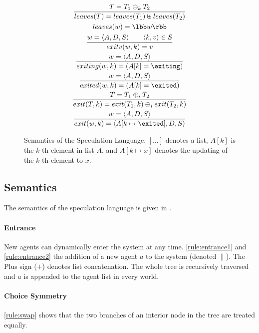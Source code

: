 \begin{figure}[ht!]
\flushright{}
\begin{gather*}
  \frac
  {T = T_1\oplus_k T_2}
  {leaves(T) = leaves(T_1)\uplus leaves(T_2)} \\
  leaves(w) = \lbb w\rbb \\
  \frac
  {w=\langle A,D,S\rangle \qquad \langle k,v\rangle\in S}
  {exitv(w,k) = v} \\
  \frac
  {w=\langle A,D,S\rangle}
  {exiting(w,k) = (A[k]=\exiting)} \\
  \frac
  {w=\langle A,D,S\rangle}
  {exited(w,k) = (A[k]=\exited)} \\
  \frac
  {T = T_1\oplus_i T_2}
  {exit(T,k) = exit(T_1,k)\oplus_i exit(T_2,k)} \\
  \frac
  {w=\langle A,D,S\rangle}
  {exit(w,k) = \langle A[k\mapsto\exited],D,S\rangle}
\end{gather*}
\caption{Semantics of the Speculation Language.
$[\dots]$ denotes a list,
$A[k]$ is the $k$-th element in list $A$, and
$A[k\mapsto x]$ denotes the updating of the $k$-th element to $x$.}
\label{fig:semantics}
\end{figure}

\subsection{Semantics}\label{sec:semantics}

The semantics of the speculation language is 
given in . 

\paragraph*{Entrance}
New agents can dynamically enter the system at any time.
\ref{rule:entrance1} and \ref{rule:entrance2} the addition of
a new agent $a$ to the system (denoted $\|$). The Plus sign ($+$) 
denotes list concatenation. The whole tree is recursively traversed and $a$ is appended to the agent list in every world. 

\paragraph*{Choice Symmetry}
\ref{rule:swap} shows that the two branches of an interior node in the tree are treated equally.

